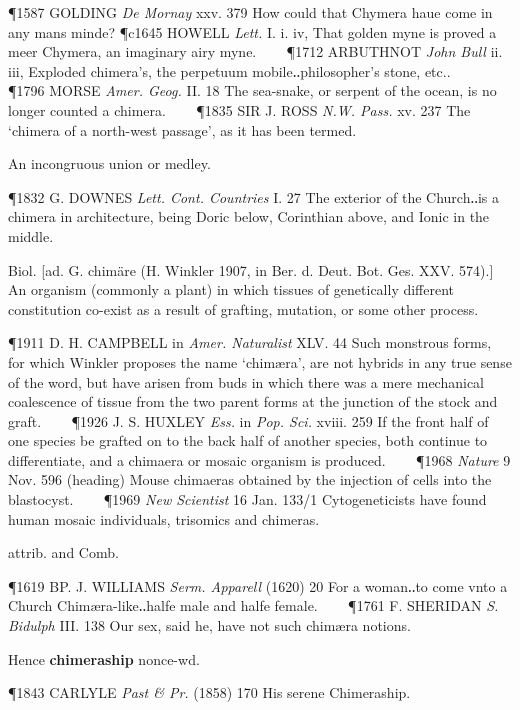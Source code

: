 \begin{description}[wide, labelwidth=!, labelindent=0pt]
\begin{myenumerate}
\P 1587 GOLDING  \textit{De Mornay} xxv. 379 How could that Chymera haue come in any mans minde?
\P c1645 HOWELL  \textit{Lett.} I. i. iv, That golden myne is proved a meer Chymera, an imaginary airy myne.    
\P 1712 ARBUTHNOT  \textit{John Bull} ii. iii, Exploded chimera's, the perpetuum mobile‥philosopher's stone, etc..    
\P 1796 MORSE  \textit{Amer. Geog.} II. 18 The sea-snake, or serpent of the ocean, is no longer counted a chimera.    
\P 1835 SIR J. ROSS  \textit{N.W. Pass.} xv. 237 The ‘chimera of a north-west passage’, as it has been termed.

 An incongruous union or medley.

\P 1832 G. DOWNES  \textit{Lett. Cont. Countries} I. 27 The exterior of the Church‥is a chimera in architecture, being Doric below, Corinthian above, and Ionic in the middle.

 Biol. [ad. G. chimäre (H. Winkler 1907, in Ber. d. Deut. Bot. Ges. XXV. 574).] An organism (commonly a plant) in which tissues of genetically different constitution co-exist as a result of grafting, mutation, or some other process.

\P 1911 D. H. CAMPBELL in \textit{Amer. Naturalist} XLV. 44 Such monstrous forms, for which Winkler proposes the name ‘chimæra’, are not hybrids in any true sense of the word, but have arisen from buds in which there was a mere mechanical coalescence of tissue from the two parent forms at the junction of the stock and graft.    
\P 1926 J. S. HUXLEY  \textit{Ess.} in \textit{Pop. Sci.} xviii. 259 If the front half of one species be grafted on to the back half of another species, both continue to differentiate, and a chimaera or mosaic organism is produced.    
\P 1968 \textit{Nature}  9 Nov. 596 (heading) Mouse chimaeras obtained by the injection of cells into the blastocyst.    
\P 1969  \textit{New Scientist} 16 Jan. 133/1 Cytogeneticists have found human mosaic individuals, trisomics and chimeras.

 attrib. and Comb.

\P 1619 BP. J. WILLIAMS  \textit{Serm. Apparell} (1620) 20 For a woman‥to come vnto a Church Chimæra-like‥halfe male and halfe female.    
\P 1761 F. SHERIDAN  \textit{S. Bidulph} III. 138 Our sex, said he, have not such chimæra notions.

\noindent
Hence \textbf{chimeraship} nonce-wd.

\P 1843 CARLYLE  \textit{Past \& Pr.} (1858) 170 His serene Chimeraship.
\end{myenumerate}



\end{description}
